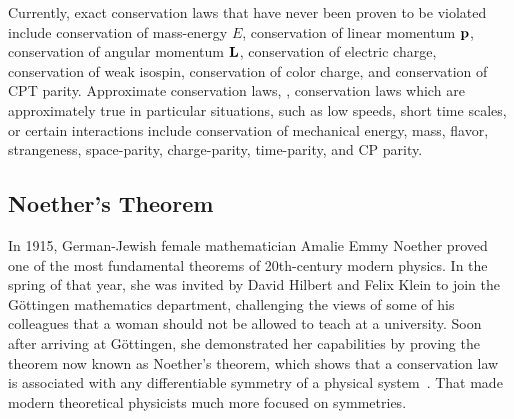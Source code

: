 Currently, exact conservation laws that have never been proven to be violated include conservation of mass-energy $E$, conservation of linear momentum $\vb{p}$, conservation of angular momentum $\vb{L}$, conservation of electric charge, conservation of weak isospin, conservation of color charge, and conservation of CPT parity. Approximate conservation laws, \ie, conservation laws which are approximately true in particular situations, such as low speeds, short time scales, or certain interactions include conservation of mechanical energy, mass, flavor, strangeness, space-parity, charge-parity, time-parity, and CP parity.

\subsection{Noether's Theorem}
\label{sec:noethers-theorem}

In 1915, German-Jewish female mathematician Amalie Emmy Noether proved one of the most fundamental theorems of 20th-century modern physics. In the spring of that year, she was invited by David Hilbert and Felix Klein to join the Göttingen mathematics department, challenging the views of some of his colleagues that a woman should not be allowed to teach at a university. Soon after arriving at Göttingen, she demonstrated her capabilities by proving the theorem now known as Noether's theorem, which shows that a conservation law is associated with any differentiable symmetry of a physical system~\cite{Lederman2004-fl}. That made modern theoretical physicists much more focused on symmetries.

